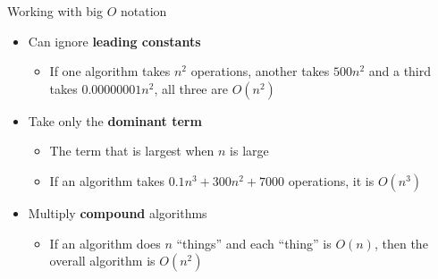 \begin{frame}{Working with big $O$ notation}
	\begin{itemize}
		\pause\item Can ignore \textbf{leading constants}
			\begin{itemize}
				\pause\item If one algorithm takes $n^2$ operations,
					another takes $500n^2$
					and a third takes $0.00000001n^2$,
					all three are $O(n^2)$
			\end{itemize}
		\pause\item Take only the \textbf{dominant term}
			\begin{itemize}
				\pause\item The term that is largest when $n$ is large
				\pause\item If an algorithm takes $0.1n^3 + 300n^2 + 7000$ operations,
					it is $O(n^3)$
			\end{itemize}
		\pause\item Multiply \textbf{compound} algorithms
			\begin{itemize}
				\pause\item If an algorithm does $n$ ``things'' and each ``thing'' is $O(n)$,
					then the overall algorithm is $O(n^2)$
			\end{itemize}
	\end{itemize}
\end{frame}


